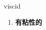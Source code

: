 
\begin{frame}
{\huge viscid}
\begin{center}
\begin{enumerate}\Large
  \item \textbf{有粘性的}
\end{enumerate}
\end{center}
\end{frame}
